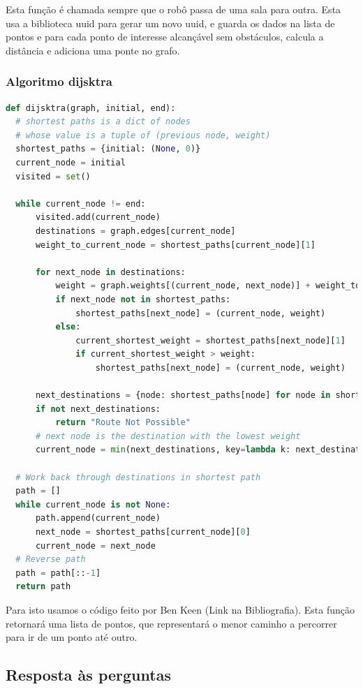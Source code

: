 \documentclass{article}
\begin{document}
Esta função é chamada sempre que o robô passa de uma sala para outra. Esta usa a biblioteca uuid para gerar um novo uuid, e guarda os dados na lista de pontos e para cada ponto de interesse alcançável sem obstáculos, calcula a distância e adiciona uma ponte no grafo.

\subsubsection{Algoritmo dijsktra}
\begin{lstlisting}[language=Python]
  def dijsktra(graph, initial, end):
  # shortest paths is a dict of nodes
  # whose value is a tuple of (previous node, weight)
  shortest_paths = {initial: (None, 0)}
  current_node = initial
  visited = set()
  
  while current_node != end:
      visited.add(current_node)
      destinations = graph.edges[current_node]
      weight_to_current_node = shortest_paths[current_node][1]

      for next_node in destinations:
          weight = graph.weights[(current_node, next_node)] + weight_to_current_node
          if next_node not in shortest_paths:
              shortest_paths[next_node] = (current_node, weight)
          else:
              current_shortest_weight = shortest_paths[next_node][1]
              if current_shortest_weight > weight:
                  shortest_paths[next_node] = (current_node, weight)
      
      next_destinations = {node: shortest_paths[node] for node in shortest_paths if node not in visited}
      if not next_destinations:
          return "Route Not Possible"
      # next node is the destination with the lowest weight
      current_node = min(next_destinations, key=lambda k: next_destinations[k][1])
  
  # Work back through destinations in shortest path
  path = []
  while current_node is not None:
      path.append(current_node)
      next_node = shortest_paths[current_node][0]
      current_node = next_node
  # Reverse path
  path = path[::-1]
  return path
\end{lstlisting}

Para isto usamos o código feito por Ben Keen (Link na Bibliografia). Esta função retornará uma lista de pontos, que representará o menor caminho a percorrer para ir de um ponto até outro.

\newpage
\subsection{Resposta às perguntas}
\end{document}
